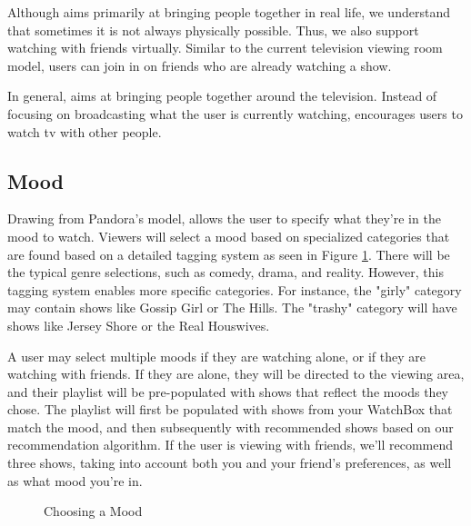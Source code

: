Although {\sys} aims primarily at bringing people together in real
life, we understand that sometimes it is not always physically
possible.  Thus, we also support watching with friends virtually.
Similar to the current television viewing room model, users can join
in on friends who are already watching a show.

In general, {\sys} aims at bringing people together around the
television.  Instead of focusing on broadcasting what the user is
currently watching, {\sys} encourages users to watch tv with other
people.

\subsection{Mood}
Drawing from Pandora's model, {\sys} allows the user to specify what
they’re in the mood to watch.  Viewers will select a mood based on
specialized categories that are found based on a detailed tagging
system as seen in Figure \ref{fig:mood}.  There will be the typical genre selections, such as comedy,
drama, and reality.  However, this tagging system enables more
specific categories.  For instance, the "girly" category may contain
shows like Gossip Girl or The Hills.  The "trashy" category will have
shows like Jersey Shore or the Real Houswives.

A user may select multiple moods if they are watching alone, or if
they are watching with friends.  If they are alone, they will be
directed to the viewing area, and their playlist will be pre-populated
with shows that reflect the moods they chose.  The playlist will first
be populated with shows from your WatchBox that match the mood, and
then subsequently with recommended shows based on our recommendation
algorithm.  If the user is viewing with friends, we'll recommend three
shows, taking into account both you and your friend's preferences, as
well as what mood you're in.

\begin{figure}
\centering
{}
\caption{Choosing a Mood}
\label{fig:mood}
\end{figure}

